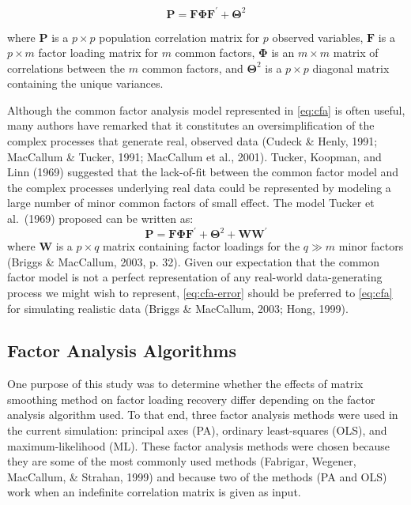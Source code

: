 \documentclass[
  english,
  man]{apa6}
\begin{document}
\begin{equation}
\mathbf{P} = \mathbf{F} \mathbf{\Phi} \mathbf{F}^{\prime} + \mathbf{\Theta}^2
\label{eq:cfa}
\end{equation}

where \(\mathbf{P}\) is a \(p \times p\) population correlation matrix for \(p\) observed variables, \(\mathbf{F}\) is a \(p \times m\) factor loading matrix for \(m\) common factors, \(\mathbf{\Phi}\) is an \(m \times m\) matrix of correlations between the \(m\) common factors, and \(\mathbf{\Theta}^2\) is a \(p \times p\) diagonal matrix containing the unique variances.

Although the common factor analysis model represented in \eqref{eq:cfa} is often useful, many authors have remarked that it constitutes an oversimplification of the complex processes that generate real, observed data (Cudeck \& Henly, 1991; MacCallum \& Tucker, 1991; MacCallum et al., 2001). Tucker, Koopman, and Linn (1969) suggested that the lack-of-fit between the common factor model and the complex processes underlying real data could be represented by modeling a large number of minor common factors of small effect. The model Tucker et al.~(1969) proposed can be written as:
\begin{equation}
\mathbf{P} = \mathbf{F} \mathbf{\Phi} \mathbf{F}^{\prime} + \mathbf{\Theta}^2 + \mathbf{WW}^{\prime}
\label{eq:cfa-error}
\end{equation}
where \(\mathbf{W}\) is a \(p \times q\) matrix containing factor loadings for the \(q \gg m\) minor factors (Briggs \& MacCallum, 2003, p. 32). Given our expectation that the common factor model is not a perfect representation of any real-world data-generating process we might wish to represent, \eqref{eq:cfa-error} should be preferred to \eqref{eq:cfa} for simulating realistic data (Briggs \& MacCallum, 2003; Hong, 1999).

\hypertarget{factor-analysis-algorithms}{%
\subsection{Factor Analysis Algorithms}\label{factor-analysis-algorithms}}

One purpose of this study was to determine whether the effects of matrix smoothing method on factor loading recovery differ depending on the factor analysis algorithm used. To that end, three factor analysis methods were used in the current simulation: principal axes (PA), ordinary least-squares (OLS), and maximum-likelihood (ML). These factor analysis methods were chosen because they are some of the most commonly used methods (Fabrigar, Wegener, MacCallum, \& Strahan, 1999) and because two of the methods (PA and OLS) work when an indefinite correlation matrix is given as input.
\end{document}
